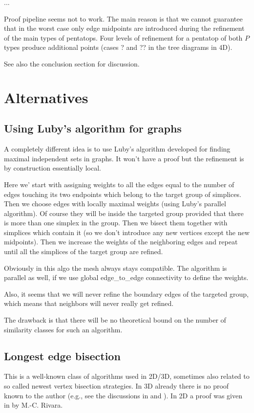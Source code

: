 \documentclass[a4paper,12pt]{amsart}
\numberwithin{equation}{section}
\begin{document}
...

Proof pipeline seems not to work. The main reason is that we cannot guarantee that in the worst case only edge midpoints are introduced during the refinement of the main types of pentatops. Four levels of refinement for a pentatop of both $P$ types produce additional points (cases ? and ?? in the tree diagrams in 4D).

See also the conclusion section for discussion.

\section{Alternatives}

\subsection{Using Luby's algorithm for graphs}
A completely different idea is to use Luby's algorithm developed for finding maximal independent sets in graphs. It won't have a proof but the refinement is by construction essentially local.

Here we' start with assigning weights to all the edges equal to the number of edges touching its two endpoints which belong to the target group of simplices.
Then we choose edges with locally maximal weights (using Luby's parallel algorithm). Of course they will be inside the targeted group provided that there is more than one simplex in the group. Then we bisect them together with simplices which contain it (so we don't introduce any new vertices except the new midpoints).
Then we increase the weights of the neighboring edges and repeat until all the simplices of the target group are refined.

Obviously in this algo the mesh always stays compatible. The algorithm is parallel as well, if we use global edge_to_edge connectivity to define the weights.

Also, it seems that we will never refine the boundary edges of the targeted group, which means that neighbors will never really get refined.

The drawback is that there will be no theoretical bound on the number of similarity classes for such an algorithm.

\subsection{Longest edge bisection}
This is a well-known class of algorithms used in 2D/3D, sometimes also related to so called newest vertex bisection strategies.
In 3D already there is no proof known to the author (e.g., see the discussions in \cite{survey} and \cite{arnold}). In 2D a proof was given in \cite{rivara} by M.-C. Rivara.
\end{document}
